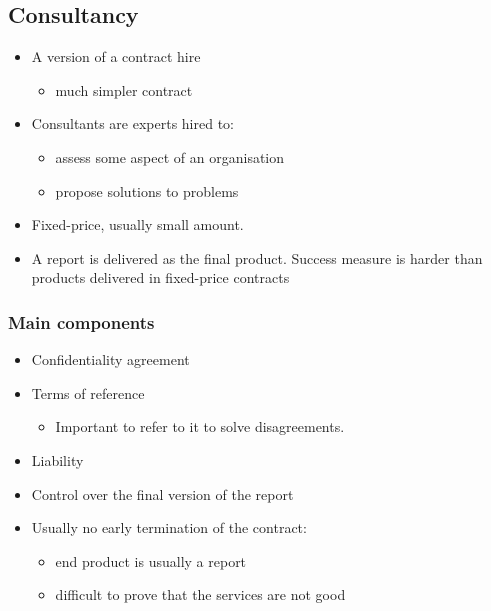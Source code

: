 \documentclass{article}
\begin{document}
\subsection{Consultancy}
\begin{itemize}
\item A version of a contract hire
\begin{itemize}
\item much simpler contract
\end{itemize}
\item Consultants are experts hired to:
\begin{itemize}
\item assess some aspect of an organisation
\item propose solutions to problems
\end{itemize}
\item Fixed-price, usually small amount.
\item A report is delivered as the final product. Success measure is harder than products delivered in fixed-price contracts
\end{itemize}



\subsubsection{Main components}
\begin{itemize}
\item Confidentiality agreement 
\item Terms of reference
\begin{itemize}
\item Important to refer to it to solve disagreements.
\end{itemize}
\item Liability
\item Control over the final version of the report
\item Usually no early termination of the contract:
\begin{itemize}
\item end product is usually a report 
\item difficult to prove that the services are not good
\end{itemize}
\end{itemize}
\end{document}

